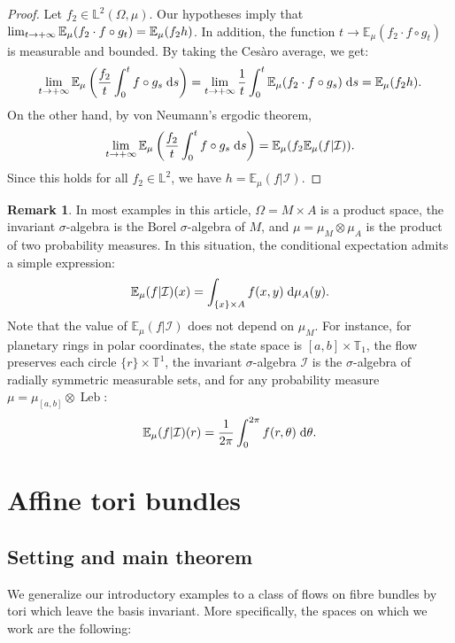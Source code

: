 \documentclass[10pt]{amsart}
\theoremstyle{definition}\newtheorem{defi}[theo]{Definition}\newtheorem{rema}[theo]{Remark}\newtheorem{exam}[theo]{Example}\newtheorem{exem}[theo]{Example}\newtheorem{nota}[theo]{Notation}
\DeclareMathOperator{\Leb}{Leb}
\newcommand{\Ebb}{\mathbb{E}}
\newcommand{\Lbb}{\mathbb{L}}
\newcommand{\Tbb}{\mathbb{T}}
\newcommand{\Ical}{\mathcal{I}}
\newcommand{\dd}{\;{\rm d}}
\begin{document}
\begin{proof}
Let $f_2 \in \Lbb^2 (\Omega, \mu)$. Our hypotheses imply that $\lim_{t \to + \infty} \Ebb_\mu (f_2 \cdot f \circ g_t)\linebreak= \Ebb_\mu (f_2 h)$. In addition, the function $t \to \Ebb_\mu (f_2 \cdot f \circ g_t)$ is measurable and bounded. By taking the Cesàro average, we get:
\[
\lim_{t \to + \infty} \Ebb_\mu \left(\frac{f_2}{t} \int_0^t f \circ g_s \dd s \right) = \lim_{t \to + \infty} \frac{1}{t} \int_0^t \Ebb_\mu (f_2 \cdot f \circ g_s) \dd s = \Ebb_\mu (f_2 h).
\]
On the other hand, by von Neumann's ergodic theorem,
\[
\lim_{t \to + \infty} \Ebb_\mu \left(\frac{f_2}{t} \int_0^t f \circ g_s \dd s \right) = \Ebb_\mu (f_2 \Ebb_\mu (f | \Ical)).
\]
Since this holds for all $f_2 \in \Lbb^2$, we have $h = \Ebb_\mu (f | \Ical)$.
\end{proof}



\begin{rema}

In most examples in this article, $\Omega = M \times A$ is a product space, the invariant $\sigma$-algebra is the Borel $\sigma$-algebra of $M$, and $\mu = \mu_M \otimes \mu_A$ is the product of two probability measures. In this situation, the conditional expectation admits a simple expression:
\[
\Ebb_\mu (f | \Ical) (x) = \int_{\{x\} \times A} f(x,y) \dd \mu_A (y).
\]
Note that the value of $\Ebb_\mu (f | \Ical)$ does not depend on $\mu_M$. For instance, for planetary rings in polar coordinates, the state space is $[a,b] \times \Tbb_1$, the flow preserves each circle $\{r\} \times \Tbb^1$, the invariant $\sigma$-algebra $\Ical$ is the $\sigma$-algebra of radially symmetric measurable sets, and for any probability measure $\mu = \mu_{[a,b]} \otimes \Leb$:
\[
\Ebb_\mu (f | \Ical) (r) = \frac{1}{2\pi} \int_0^{2 \pi} f(r,\theta) \dd \theta.
\]
\end{rema}


\section{Affine tori bundles}\label{sec:FibreBundle}

\subsection{Setting and main theorem}\label{subsec:TheoremePrincipal}


We generalize our introductory examples to a class of flows on fibre bundles by tori which leave the basis invariant. More specifically, the spaces on which we work are the following:
\end{document}
